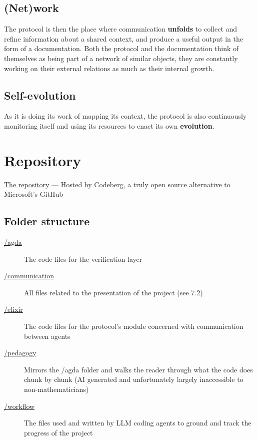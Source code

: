 \documentclass[11pt]{article}
\begin{document}
\subsection{(Net)work}

The protocol is then the place where communication \textbf{unfolds} to collect and refine information about a shared context, and produce a useful output in the form of a documentation. Both the protocol and the documentation think of themselves as being part of a network of similar objects, they are constantly working on their external relations as much as their internal growth.

\subsection{Self-evolution}

As it is doing its work of mapping its context, the protocol is also continuously monitoring itself and using its resources to enact its own \textbf{evolution}.

\section{Repository}

\href{https://codeberg.org/doc2cog/hoapa}{The repository} --- Hosted by Codeberg, a truly open source alternative to Microsoft's GitHub

\subsection{Folder structure}

\begin{description}

\item[\href{https://codeberg.org/doc2cog/hoapa/src/branch/main/agda}{/agda}]
The code files for the verification layer

\item[\href{https://codeberg.org/doc2cog/hoapa/src/branch/main/communication}{/communication}]
All files related to the presentation of the project (see 7.2)

\item[\href{https://codeberg.org/doc2cog/hoapa/src/branch/main/elixir}{/elixir}]
The code files for the protocol's module concerned with communication between agents

\item[\href{https://codeberg.org/doc2cog/hoapa/src/branch/main/pedagogy}{/pedagogy}]
Mirrors the /agda folder and walks the reader through what the code does chunk by chunk (AI generated and unfortunately largely inaccessible to non-mathematicians)

\item[\href{https://codeberg.org/doc2cog/hoapa/src/branch/main/workflow}{/workflow}]
The files used and written by LLM coding agents to ground and track the progress of the project

\end{description}
\end{document}

